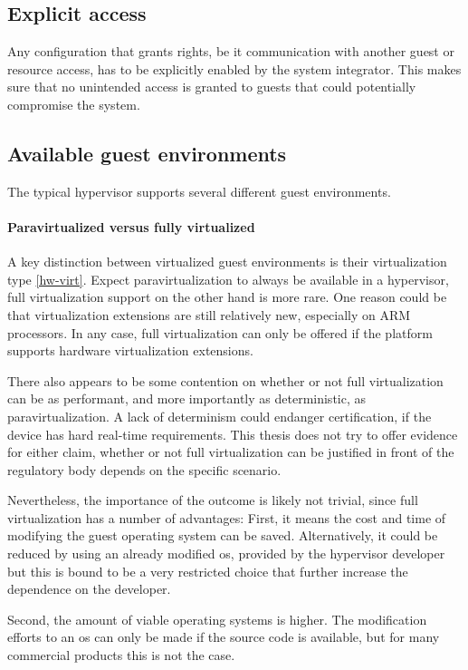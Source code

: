 \subsection{Explicit access}
Any configuration that grants rights, be it communication with another guest or resource access, has to be explicitly enabled by the system integrator. This makes sure that no unintended access is granted to guests that could potentially compromise the system.
\subsection{Available guest environments}
The typical hypervisor supports several different guest environments.
\paragraph{Paravirtualized versus fully virtualized}
A key distinction between virtualized guest environments is their virtualization type \ref{hw-virt}. Expect paravirtualization to always be available in a hypervisor, full virtualization support on the other hand is more rare. One reason could be that virtualization extensions are still relatively new, especially on ARM processors. In any case, full virtualization can only be offered if the platform supports hardware virtualization extensions.

There also appears to be some contention on whether or not full virtualization can be as performant, and more importantly as deterministic, as paravirtualization. A lack of determinism could endanger certification, if the device has hard real-time requirements. This thesis does not try to offer evidence for either claim, whether or not full virtualization can be justified in front of the regulatory body depends on the specific scenario. 

Nevertheless, the importance of the outcome is likely not trivial, since full virtualization has a number of advantages: First, it means the cost and time of modifying the guest operating system can be saved. Alternatively, it could be reduced by using an already modified \acrfull{os}, provided by the hypervisor developer but this is bound to be a very restricted choice that further increase the dependence on the developer.

Second, the amount of viable operating systems is higher. The modification efforts to an \acrshort{os} can only be made if the source code is available, but for many commercial products this is not the case. 

